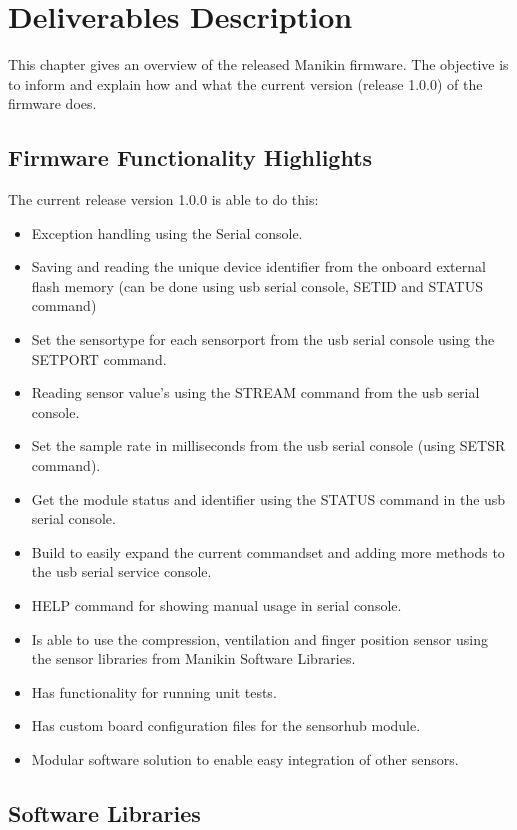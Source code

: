 \chapter{Deliverables Description}
This chapter gives an overview of the released Manikin firmware. The objective is to inform and explain how and what the current version (release 1.0.0) of the firmware does.
\section{Firmware Functionality Highlights}
The current release version 1.0.0 is able to do this:
\begin{itemize}
  \item Exception handling using the Serial console.
  \item Saving and reading the unique device identifier from the onboard external flash memory (can be done using usb serial console, SETID and STATUS command)
  \item Set the sensortype for each sensorport from the usb serial console using the SETPORT command.
  \item Reading sensor value's using the STREAM command from the usb serial console.
  \item Set the sample rate in milliseconds from the usb serial console (using SETSR command).
  \item Get the module status and identifier using the STATUS command in the usb serial console.
  \item Build to easily expand the current commandset and adding more methods to the usb serial service console.
  \item HELP command for showing manual usage in serial console.
  \item Is able to use the compression, ventilation and finger position sensor using the sensor libraries from Manikin Software Libraries.
  \item Has functionality for running unit tests.
  \item Has custom board configuration files for the sensorhub module.
  \item Modular software solution to enable easy integration of other sensors.
\end{itemize}

\section{Software Libraries}

